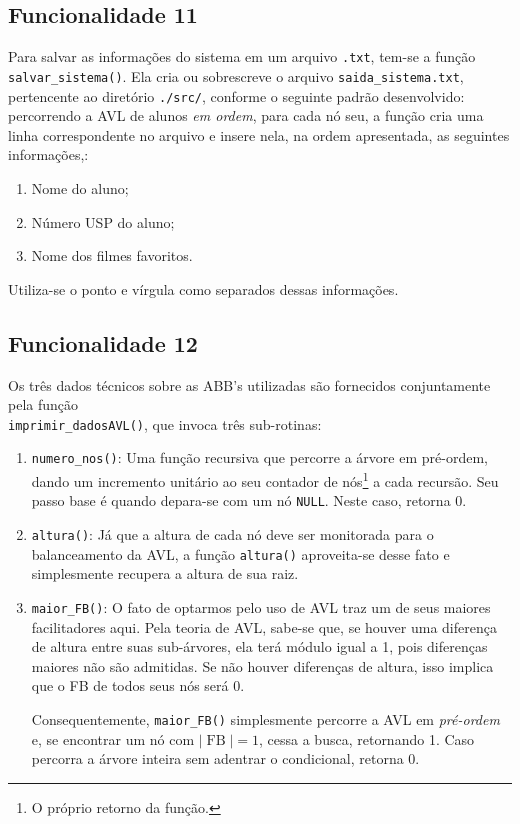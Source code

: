 \documentclass[12pt,a4paper,portuguese]{article}
\begin{document}
    \subsection*{Funcionalidade 11}
        Para salvar as informações do sistema em um arquivo \verb|.txt|, tem-se a função \verb|salvar_sistema()|. Ela cria ou sobrescreve o arquivo \verb|saida_sistema.txt|, pertencente ao diretório \verb|./src/|, conforme o seguinte padrão desenvolvido: percorrendo a AVL de alunos \textit{em ordem}, para cada nó seu, a função cria uma linha correspondente no arquivo e insere nela, na ordem apresentada, as seguintes informações,:
\begin{multicols}{3}
        \begin{enumerate}
            \item Nome do aluno;
            \item Número USP do aluno;
            \item Nome dos filmes favoritos.
        \end{enumerate}
\end{multicols}
        Utiliza-se o ponto e vírgula como separados dessas informações.
    \subsection*{Funcionalidade 12}
        Os três dados técnicos sobre as ABB's utilizadas são fornecidos conjuntamente pela função \\\verb|imprimir_dadosAVL()|, que invoca três sub-rotinas:
        \begin{enumerate}
            \item\verb|numero_nos()|: Uma função recursiva que percorre a árvore em pré-ordem, dando um incremento unitário ao seu contador de nós\footnote{O próprio retorno da função.} a cada recursão. Seu passo base é quando depara-se com um nó \verb|NULL|. Neste caso, retorna 0.
            
            \item\verb|altura()|: Já que a altura de cada nó deve ser monitorada para o balanceamento da AVL, a função \verb|altura()| aproveita-se desse fato e simplesmente recupera a altura de sua raiz.
            
            \item\verb|maior_FB()|: O fato de optarmos pelo uso de AVL traz um de seus maiores facilitadores aqui. Pela teoria de AVL, sabe-se que, se houver uma diferença de altura entre suas sub-árvores, ela terá módulo igual a 1, pois diferenças maiores não são admitidas. Se não houver diferenças de altura, isso implica que o FB de todos seus nós será 0.
            
            Consequentemente, \verb|maior_FB()| simplesmente percorre a AVL em \textit{pré-ordem} e, se encontrar um nó com $\lvert\operatorname{FB}\rvert=1$, cessa a busca, retornando 1. Caso percorra a árvore inteira sem adentrar o condicional, retorna 0.
        \end{enumerate}
\end{document}
